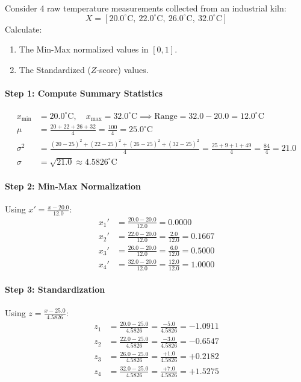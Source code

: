 \begin{example}
Consider 4 raw temperature measurements collected from an industrial kiln:
\begin{equation*}
X = [20.0^\circ\text{C}, \ 22.0^\circ\text{C}, \ 26.0^\circ\text{C}, \ 32.0^\circ\text{C}]
\end{equation*}
Calculate:
\begin{enumerate}
    \item The Min-Max normalized values in $[0, 1]$.
    \item The Standardized ($Z$-score) values.
\end{enumerate}

\paragraph{Step 1: Compute Summary Statistics}
\begin{align*}
x_{\min} &= 20.0^\circ\text{C}, \quad x_{\max} = 32.0^\circ\text{C} \implies \text{Range} = 32.0 - 20.0 = 12.0^\circ\text{C} \\
\mu &= \frac{20 + 22 + 26 + 32}{4} = \frac{100}{4} = 25.0^\circ\text{C} \\
\sigma^2 &= \frac{(20-25)^2 + (22-25)^2 + (26-25)^2 + (32-25)^2}{4} = \frac{25 + 9 + 1 + 49}{4} = \frac{84}{4} = 21.0 \\
\sigma &= \sqrt{21.0} \approx 4.5826^\circ\text{C}
\end{align*}

\paragraph{Step 2: Min-Max Normalization}
Using $x' = \frac{x - 20.0}{12.0}$:
\begin{align*}
x_1' &= \frac{20.0 - 20.0}{12.0} = \mathbf{0.0000} \\
x_2' &= \frac{22.0 - 20.0}{12.0} = \frac{2.0}{12.0} = \mathbf{0.1667} \\
x_3' &= \frac{26.0 - 20.0}{12.0} = \frac{6.0}{12.0} = \mathbf{0.5000} \\
x_4' &= \frac{32.0 - 20.0}{12.0} = \frac{12.0}{12.0} = \mathbf{1.0000}
\end{align*}

\paragraph{Step 3: Standardization}
Using $z = \frac{x - 25.0}{4.5826}$:
\begin{align*}
z_1 &= \frac{20.0 - 25.0}{4.5826} = \frac{-5.0}{4.5826} = \mathbf{-1.0911} \\
z_2 &= \frac{22.0 - 25.0}{4.5826} = \frac{-3.0}{4.5826} = \mathbf{-0.6547} \\
z_3 &= \frac{26.0 - 25.0}{4.5826} = \frac{+1.0}{4.5826} = \mathbf{+0.2182} \\
z_4 &= \frac{32.0 - 25.0}{4.5826} = \frac{+7.0}{4.5826} = \mathbf{+1.5275}
\end{align*}
\end{example}

